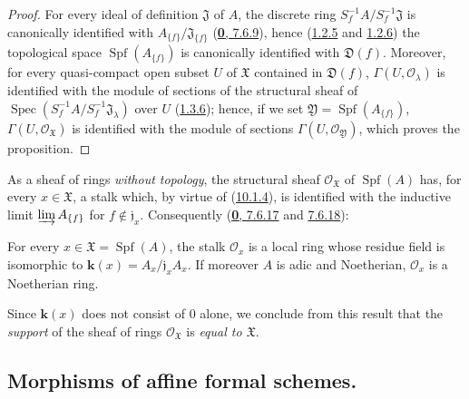 \begin{proof}
For every ideal of definition $\mathfrak{J}$ of $A$, the discrete ring
$S_f^{-1}A/S_f^{-1}\mathfrak{J}$ is canonically identified with
$A_{\{f\}}/\mathfrak{J}_{\{f\}}$
(\hyperref[0.7.6.9]{\textbf{0}, 7.6.9}), hence
(\hyperref[I.1.2.5]{1.2.5} and \hyperref[I.1.2.6]{1.2.6}) the
topological space $\operatorname{Spf}(A_{\{f\}})$ is canonically identified
with $\mathfrak{D}(f)$. Moreover, for every quasi-compact open subset $U$
of $\mathfrak{X}$ contained in $\mathfrak{D}(f)$,
$\Gamma(U,\mathscr{O}_\lambda)$ is identified with the module of sections
of the structural sheaf of
$\operatorname{Spec}(S_f^{-1}A/S_f^{-1}\mathfrak{J}_\lambda)$ over
$U$ (\hyperref[I.1.3.6]{1.3.6}); hence, if we set
$\mathfrak{Y}=\operatorname{Spf}(A_{\{f\}})$,
$\Gamma(U,\mathscr{O}_{\mathfrak{X}})$ is identified with the module of
sections $\Gamma(U,\mathscr{O}_{\mathfrak{Y}})$, which proves the
proposition.
\end{proof}

\begin{env}[10.1.5]
\label{I.10.1.5}
As a sheaf of rings \emph{without topology}, the structural sheaf
$\mathscr{O}_{\mathfrak{X}}$ of
$\operatorname{Spf}(A)$ has, for every $x\in\mathfrak{X}$, a stalk which,
by virtue of (\hyperref[I.10.1.4]{10.1.4}), is identified with the
inductive limit
$\varinjlim A_{\{f\}}$ for $f\notin\mathfrak{j}_x$. Consequently
(\hyperref[0.7.6.17]{\textbf{0}, 7.6.17} and
\hyperref[0.7.6.18]{7.6.18}):
\end{env}

\begin{proposition}[10.1.6]
\label{I.10.1.6}
For every $x\in\mathfrak{X}=\operatorname{Spf}(A)$, the stalk
$\mathscr{O}_x$ is a local ring whose residue field is isomorphic to
$\boldsymbol{k}(x)=A_x/\mathfrak{j}_xA_x$. If moreover $A$ is adic and Noetherian,
$\mathscr{O}_x$ is a Noetherian ring.
\end{proposition}

Since $\boldsymbol{k}(x)$ does not consist of 0 alone, we conclude from this result
that the \emph{support} of the sheaf of rings $\mathscr{O}_{\mathfrak{X}}$
is \emph{equal to $\mathfrak{X}$}.

\subsection{Morphisms of affine formal schemes.}
\label{subsection:I.10.2}

